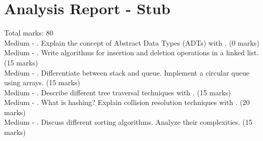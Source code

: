 \documentclass{article}
\begin{document}
\section*{Analysis Report - Stub}
Total marks: 80\\
Medium - . Explain the concept of Abstract Data Types (ADTs) with \nexamples. (0 marks)\\
Medium - . Write algorithms for insertion and deletion operations in a linked list. (15 marks)\\
Medium - . Differentiate between stack and queue. Implement a circular queue using arrays. (15 marks)\\
Medium - . Describe different tree traversal techniques with \nexamples. (15 marks)\\
Medium - . What is hashing? Explain collision resolution techniques with \nexamples. (20 marks)\\
Medium - . Discuss different sorting algorithms. Analyze their \ntime complexities. (15 marks)\\
\end{document}
